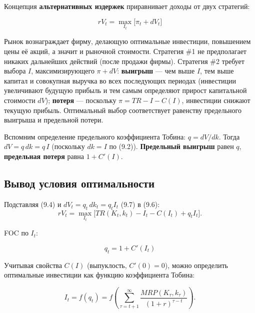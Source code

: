 \documentclass[10pt,a4paper]{article}
\begin{document}
Концепция \textbf{альтернативных издержек} приравнивает доходы от двух стратегий:
\begin{formulabox}
\begin{equation}
rV_t = \max_{I_t}\big[\pi_t + dV_t\big] \tag{9.6}
\end{equation}
\end{formulabox}

\begin{intuition}
Рынок вознаграждает фирму, делающую оптимальные инвестиции, повышением цены её акций, а значит и рыночной стоимости. Стратегия \#1 не предполагает никаких дальнейших действий (после продажи фирмы). Стратегия \#2 требует выбора $I$, максимизирующего $\pi+dV$: \textbf{выигрыш} — чем выше $I$, тем выше капитал и совокупная выручка во всех последующих периодах (инвестиции увеличивают будущую прибыль и тем самым определяют прирост капитальной стоимости $dV$); \textbf{потеря} — поскольку $\pi=TR-I-C(I)$, инвестиции снижают текущую прибыль. Оптимальный выбор соответствует равенству предельного выигрыша и предельной потери.
\end{intuition}

Вспомним определение предельного коэффициента Тобина: $q=dV/dk$. Тогда $dV = q\,dk = q\,I$ (поскольку $dk=I$ по (9.2)). \textbf{Предельный выигрыш} равен $q$, \textbf{предельная потеря} равна $1+C'(I)$.

\subsection{Вывод условия оптимальности}

Подставляя (9.4) и $dV_t = q_t\,dk_t = q_t I_t$ (9.7) в (9.6):
$$rV_t = \max_{I_t}\big[TR(K_t,k_t) - I_t - C(I_t) + q_t I_t\big].$$

FOC по $I_t$:
\begin{formulabox}
\begin{equation}
q_t = 1 + C'(I_t) \tag{9.8}
\end{equation}
\end{formulabox}

Учитывая свойства $C(I)$ (выпуклость, $C'(0)=0$), можно определить оптимальные инвестиции как функцию коэффициента Тобина:
\begin{formulabox}
\begin{equation}
I_t = f(q_t) = f\left(\sum_{\tau=t+1}^{\infty}\frac{MRP(K_\tau,k_\tau)}{(1+r)^{\tau-t}}\right). \tag{9.9}
\end{equation}
\end{formulabox}
\end{document}
